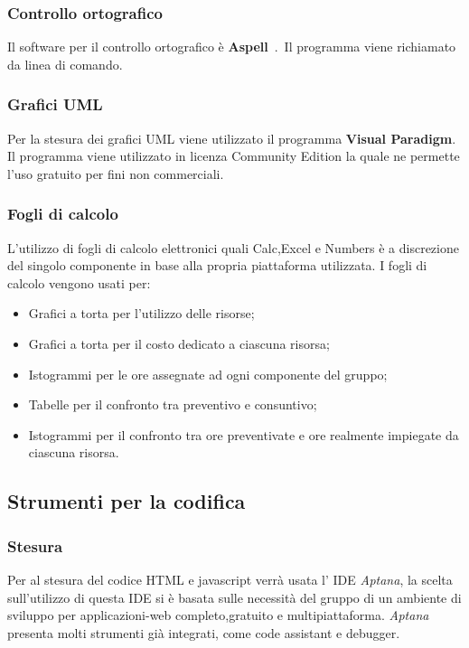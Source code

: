 \subsubsection{Controllo ortografico}

Il software per il controllo ortografico è \textbf{Aspell}\ .\ Il programma viene richiamato da linea di comando.


\subsubsection{Grafici UML} 

Per la stesura dei grafici UML viene utilizzato il programma \textbf{Visual Paradigm}. Il programma viene utilizzato in licenza Community Edition la quale ne permette l’uso gratuito per fini non commerciali.

\subsubsection{Fogli di calcolo}
\label{sec:fogliDiCalcolo}
L'utilizzo di fogli di calcolo elettronici quali Calc,Excel e Numbers è a discrezione del singolo componente in base alla propria piattaforma utilizzata.
I fogli di calcolo vengono usati per:
\begin{itemize}
\item Grafici a torta per l'utilizzo delle risorse;
\item Grafici a torta per il costo dedicato a ciascuna risorsa;
\item Istogrammi per le ore assegnate ad ogni componente del gruppo;
\item Tabelle per il confronto tra preventivo e consuntivo;
\item Istogrammi per il confronto tra ore preventivate e ore realmente impiegate da
ciascuna risorsa.
\end{itemize}

\subsection{Strumenti per la codifica}
\label{sec:strumentiCodifica}
\subsubsection{Stesura}
Per al stesura del codice HTML e javascript verrà usata l' IDE \emph{Aptana}, la scelta sull'utilizzo di questa IDE si è basata sulle necessità del gruppo di un ambiente di sviluppo per applicazioni-web completo,gratuito e multipiattaforma.
\emph{Aptana} presenta molti strumenti già integrati, come code assistant e debugger. 
